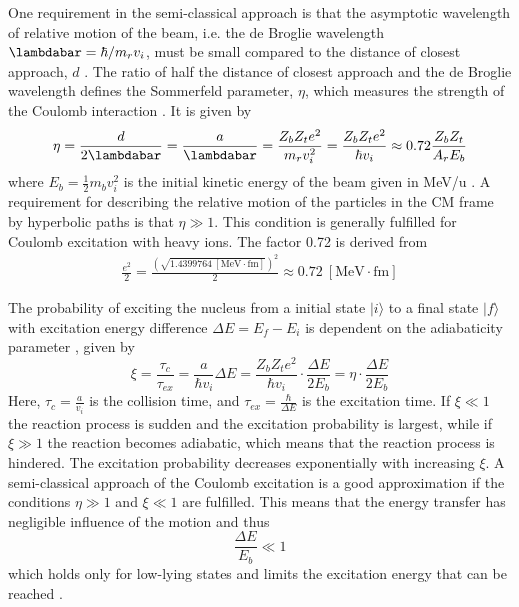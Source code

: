 \documentclass[twoside,english]{uiofysmaster/uiofysmaster}
\begin{document}
One requirement in the semi-classical approach is that the asymptotic wavelength of relative motion of the beam, i.e. the de Broglie wavelength ${\lambdabar = \hbar/m_r v_i}$, must be small compared to the distance of closest approach, $d$ \cite{RBass, EE-Coulex}.
The ratio of half the distance of closest approach and the de Broglie wavelength defines the Sommerfeld parameter, $\eta$, which measures the strength of the Coulomb interaction \cite{Cline1969}.
It is given by
\begin{equation}
	\eta = \frac{d}{2\lambdabar} = \frac{a}{\lambdabar} = \frac{Z_b Z_t e^2}{m_r v_i^2} = \frac{Z_b Z_t e^2}{\hbar v_i} \approx 0.72 \frac{Z_b Z_t}{A_r E_b}
\end{equation}
where $E_b = \tfrac{1}{2} m_b v_i^2$ is the initial kinetic energy of the beam given in MeV/u \cite{RBass}.
A requirement for describing the relative motion of the particles in the CM frame by hyperbolic paths is that $\eta \gg 1$.
This condition is generally fulfilled for Coulomb excitation with heavy ions.
The factor 0.72 is derived from 
\begin{align}
	\frac{e^2}{2} = \frac{(\sqrt{1.4399764 ~[\text{MeV} \cdot \text{fm}]})^2}{2} \approx 0.72 ~[\text{MeV} \cdot \text{fm}]
\end{align}

The probability of exciting the nucleus from a initial state $|i\rangle$ to a final state $|f\rangle$ with excitation energy difference $\Delta E = E_f - E_i$ is dependent on the adiabaticity parameter \cite{Niedermaier, NaR, RBass}, given by 
\begin{equation}
	\xi = \frac{\tau_c}{\tau_{ex}} = \frac{a}{\hbar v_i}  \Delta E = \frac{Z_b Z_t e^2}{\hbar v_i} \cdot \frac{\Delta E}{2E_b} = \eta \cdot \frac{\Delta E}{2E_b}
\end{equation}
Here, $\tau_c = \frac{a}{v_i}$ is the collision time, and $\tau_{ex} = \frac{\hbar}{\Delta E}$ is the excitation time.
If $\xi \ll 1$ the reaction process is sudden and the excitation probability is largest, while if $\xi \gg 1$ the reaction becomes adiabatic, which means that the reaction process is hindered. 
The excitation probability decreases exponentially with increasing $\xi$. 
A semi-classical approach of the Coulomb excitation is a good approximation if the conditions $\eta \gg 1$ and $\xi \ll 1$ are fulfilled.
This means that the energy transfer has negligible influence of the motion and thus  
\begin{equation}
	\frac{\Delta E}{E_b} \ll 1
\end{equation}
which holds only for low-lying states and limits the excitation energy that can be reached \cite{EE-Coulex, RBass}.
\end{document}
